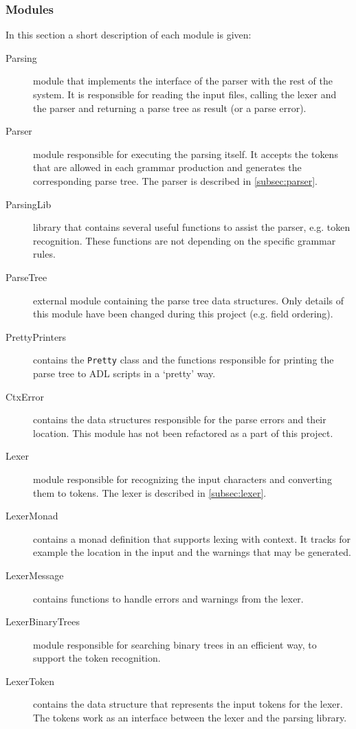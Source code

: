   \subsubsection{Modules}
  \label{subsec:parser-modules}
  In this section a short description of each module is given:%
  \begin{description}
    \item[Parsing] module that implements the interface of the parser with the rest of the system.
      It is responsible for reading the input files, calling the lexer and the parser and returning a parse tree as result (or a parse error).

    \item[Parser] module responsible for executing the parsing itself.
      It accepts the tokens that are allowed in each grammar production and generates the corresponding parse tree.
      The parser is described in \autoref{subsec:parser}.
      
    \item[ParsingLib] library that contains several useful functions to assist the parser, e.g. token recognition.
      These functions are not depending on the specific grammar rules.
      
    \item[ParseTree] external module containing the parse tree data structures.
      Only details of this module have been changed during this project (e.g. field ordering).
    
    \item[PrettyPrinters] contains the \texttt{Pretty} class and the functions responsible for printing the parse tree to ADL scripts in a `pretty' way.
    
    \item[CtxError] contains the data structures responsible for the parse errors and their location.
      This module has not been refactored as a part of this project.
    
    \item[Lexer] module responsible for recognizing the input characters and converting them to tokens.
      The lexer is described in \autoref{subsec:lexer}.
    
    \item[LexerMonad] contains a monad definition that supports lexing with context.
      It tracks for example the location in the input and the warnings that may be generated.
    
    \item[LexerMessage] contains functions to handle errors and warnings from the lexer.
    
    \item[LexerBinaryTrees] module responsible for searching binary trees in an efficient way, to support the token recognition.
    
    \item[LexerToken] contains the data structure that represents the input tokens for the lexer.
      The tokens work as an interface between the lexer and the parsing library.
  \end{description}

